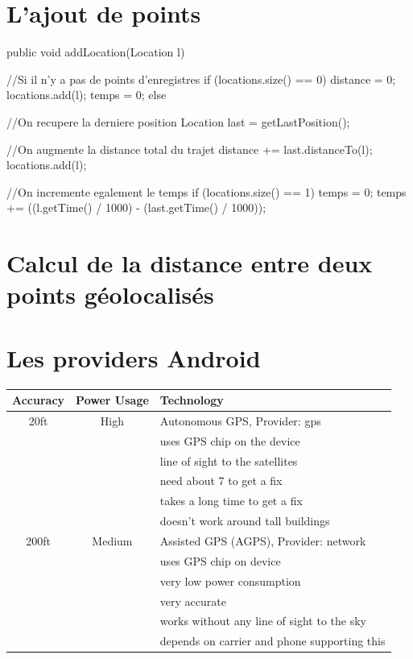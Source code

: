 \begin{appendices}
\chapter{L'ajout de points}

\label{Annexe1}
\begin{java}  
public void addLocation(Location l) {
	//Si il n'y a pas de points d'enregistres
	if (locations.size() == 0) {
		distance = 0;
		locations.add(l);
		temps = 0;
	} else {
	
	//On recupere la derniere position 
	Location last = getLastPosition();
	
	//On augmente la distance total du trajet 
	distance += last.distanceTo(l);
	locations.add(l);
 	
 	//On incremente egalement le temps 
	if (locations.size() == 1) {
		temps = 0;
	} 
	temps += ((l.getTime() / 1000) - (last.getTime() / 1000));   
	}
}
\end{java}

\chapter{Calcul de la distance entre deux points géolocalisés}
\label{Annexe2}

\chapter{Les providers Android}
\label{Annexe3}
\begin{table}[H]
\begin{center}
   \begin{tabular}{| c | c | l | }
     \hline
     Accuracy & Power Usage & Technology \\ \hline
     20ft & High & Autonomous GPS, Provider: gps \\ 
     && uses GPS chip on the device \\
     && line of sight to the satellites \\
     && need about 7 to get a fix \\
     && takes a long time to get a fix \\
     && doesn’t work around tall buildings \\ \hline
 
     200ft & Medium & Assisted GPS (AGPS), Provider: network \\ 
     && uses GPS chip on device \\
	 && very low power consumption \\
	 && very accurate \\
	 && works without any line of sight to the sky \\
	 && depends on carrier and phone supporting this \\ \hline
    

\end{tabular}
\end{center}
\end{table}
\end{appendices}

